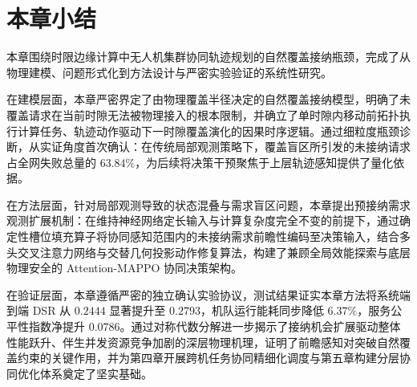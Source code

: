 \section{本章小结}
\label{sec:ch3-summary}

本章围绕时限边缘计算中无人机集群协同轨迹规划的自然覆盖接纳瓶颈，完成了从物理建模、问题形式化到方法设计与严密实验验证的系统性研究。

在建模层面，本章严密界定了由物理覆盖半径决定的自然覆盖接纳模型，明确了未覆盖请求在当前时隙无法被物理接入的根本限制，并确立了单时隙内移动前拓扑执行计算任务、轨迹动作驱动下一时隙覆盖演化的因果时序逻辑。通过细粒度瓶颈诊断，从实证角度首次确认：在传统局部观测策略下，覆盖盲区所引发的未接纳请求占全网失败总量的 $63.84\%$，为后续将决策干预聚焦于上层轨迹感知提供了量化依据。

在方法层面，针对局部观测导致的状态混叠与需求盲区问题，本章提出预接纳需求观测扩展机制：在维持神经网络定长输入与计算复杂度完全不变的前提下，通过确定性槽位填充算子将协同感知范围内的未接纳需求前瞻性编码至决策输入，结合多头交叉注意力网络与交替几何投影动作修复算法，构建了兼顾全局效能探索与底层物理安全的 Attention-MAPPO 协同决策架构。

在验证层面，本章遵循严密的独立确认实验协议，测试结果证实本章方法将系统端到端 DSR 从 $0.2444$ 显著提升至 $0.2793$，机队运行能耗同步降低 $6.37\%$，服务公平性指数净提升 $0.0786$。通过对称代数分解进一步揭示了接纳机会扩展驱动整体性能跃升、伴生并发资源竞争加剧的深层物理机理，证明了前瞻感知对突破自然覆盖约束的关键作用，并为第四章开展跨机任务协同精细化调度与第五章构建分层协同优化体系奠定了坚实基础。


